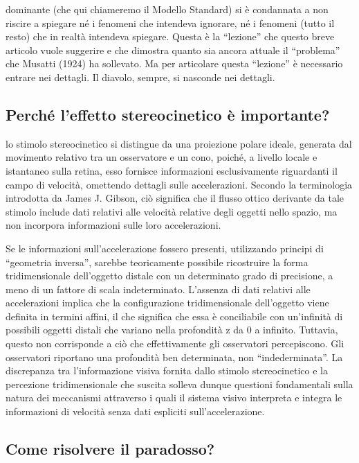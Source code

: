 \documentclass[
  man]{apa6}
\begin{document}
dominante (che qui chiameremo il Modello Standard) si è condannata a non riscire a spiegare né i fenomeni che intendeva ignorare, né i fenomeni (tutto il resto) che in realtà intendeva spiegare. Questa è la ``lezione'' che questo breve articolo vuole suggerire e che dimostra quanto sia ancora attuale il ``problema'' che Musatti (1924) ha sollevato. Ma per articolare questa ``lezione'' è necessario entrare nei dettagli. Il diavolo, sempre, si nasconde nei dettagli.

\subsection{Perché l'effetto stereocinetico è importante?}\label{perchuxe9-leffetto-stereocinetico-uxe8-importante}

lo stimolo stereocinetico si distingue da una proiezione polare ideale, generata dal movimento relativo tra un osservatore e un cono, poiché, a livello locale e istantaneo sulla retina, esso fornisce informazioni esclusivamente riguardanti il campo di velocità, omettendo dettagli sulle accelerazioni. Secondo la terminologia introdotta da James J. Gibson, ciò significa che il flusso ottico derivante da tale stimolo include dati relativi alle velocità relative degli oggetti nello spazio, ma non incorpora informazioni sulle loro accelerazioni.

Se le informazioni sull'accelerazione fossero presenti, utilizzando principi di ``geometria inversa'', sarebbe teoricamente possibile ricostruire la forma tridimensionale dell'oggetto distale con un determinato grado di precisione, a meno di un fattore di scala indeterminato. L'assenza di dati relativi alle accelerazioni implica che la configurazione tridimensionale dell'oggetto viene definita in termini affini, il che significa che essa è conciliabile con un'infinità di possibili oggetti distali che variano nella profondità z da 0 a infinito. Tuttavia, questo non corrisponde a ciò che effettivamente gli osservatori percepiscono. Gli osservatori riportano una profondità ben determinata, non ``indederminata''. La discrepanza tra l'informazione visiva fornita dallo stimolo stereocinetico e la percezione tridimensionale che suscita solleva dunque questioni fondamentali sulla natura dei meccanismi attraverso i quali il sistema visivo interpreta e integra le informazioni di velocità senza dati espliciti sull'accelerazione.

\subsection{Come risolvere il paradosso?}\label{come-risolvere-il-paradosso}
\end{document}
